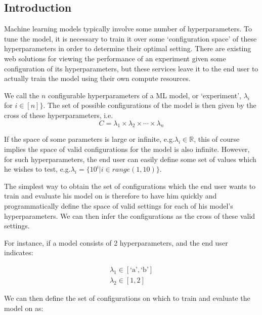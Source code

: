 \documentclass[12pt,oneside]{amsart}
\makeatletter
\def\param{\lambda}
\def\reals{\mathbb{R}}
\newcommand*\eg{e.g.\@\xspace}
\newcommand*\ie{i.e.\@\xspace}
\makeatother
\begin{document}
\maketitle
\setlength{\columnsep}{20pt}
\begin{multicols}{2}

\section{Introduction}\label{sec:introduction}
Machine learning models typically involve some number of hyperparameters.
To tune the model, it is necessary to train it over some `configuration space' of these hyperparameters in order to determine their optimal setting.
There are existing web solutions for viewing the performance of an experiment given some configuration of its hyperparameters, but these services leave it to the end user to actually train the model using their own compute resources.

We call the $n$ configurable hyperparameters of a ML model, or `experiment', $\param_i$ for $i \in [n]\}$.
The set of possible configurations of the model is then given by the cross of these hyperparameters, \ie
\[
C = \param_1 \times \param_2 \times \cdots \times \param_n
\]

If the space of some parameters is large or infinite, \eg $\param_i \in \reals$, this of course implies the space of valid configurations for the model is also infinite.
However, for such hyperparameters, the end user can easily define some set of values which he wishes to test, \eg $\lambda_i = \{ 10^i | i \in range(1, 10)\}$.

The simplest way to obtain the set of configurations which the end user wants to train and evaluate his model on is therefore to have him quickly and programmatically define the space of valid settings for each of his model's hyperparameters.
We can then infer the configurations as the cross of these valid settings.

For instance, if a model consists of 2 hyperparameters, and the end user indicates:

\begin{eqnarray}
\param_1 \in [\text{`a'}, \text{`b'}] \\
\param_2 \in [1, 2]
\end{eqnarray}

We can then define the set of configurations on which to train and evaluate the model on as:


\end{multicols}
\end{document}
